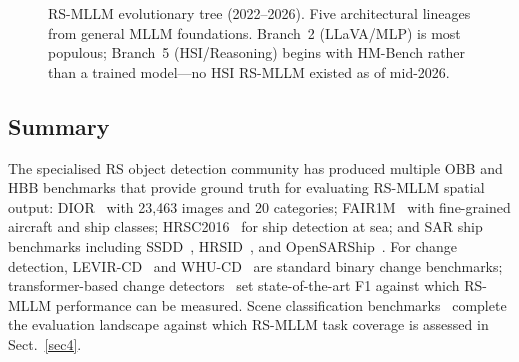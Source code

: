 \begin{figure}[h]
\caption{RS-MLLM evolutionary tree (2022--2026). Five architectural lineages from
general MLLM foundations. Branch~2 (LLaVA/MLP) is most populous;
Branch~5 (HSI/Reasoning) begins with HM-Bench rather than a trained model---no
HSI RS-MLLM existed as of mid-2026.}\label{fig:evolution_tree}
\end{figure}

\subsection*{Summary}

The specialised RS object detection community has produced multiple OBB and HBB benchmarks that provide ground truth for evaluating RS-MLLM spatial output: DIOR~\cite{dior2020} with 23,463 images and 20 categories; FAIR1M~\cite{fair12022} with fine-grained aircraft and ship classes; HRSC2016~\cite{hrsc2016} for ship detection at sea; and SAR ship benchmarks including SSDD~\cite{ssdd2021}, HRSID~\cite{hrsid2020}, and OpenSARShip~\cite{opensar2023}. For change detection, LEVIR-CD~\cite{levircd2020} and WHU-CD~\cite{whu_cd2019} are standard binary change benchmarks; transformer-based change detectors~\cite{chen2021remote,wu2023changeformer,changemixin2024} set state-of-the-art F1 against which RS-MLLM performance can be measured. Scene classification benchmarks~\cite{rsod2014,ben2021} complete the evaluation landscape against which RS-MLLM task coverage is assessed in Sect.~\ref{sec4}.


